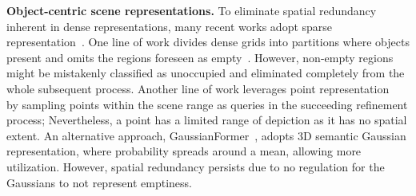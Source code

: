 \textbf{Object-centric scene representations.}
To eliminate spatial redundancy inherent in dense representations, many recent works adopt sparse representation~\cite{tang2024sparseocc,lu2023octreeocc,huang2024gaussian}. 
One line of work divides dense grids into partitions where objects present and omits the regions foreseen as empty~\cite{lu2023octreeocc, tang2024sparseocc}. 
However, non-empty regions might be mistakenly classified as unoccupied and eliminated completely from the whole subsequent process. 
Another line of work leverages point representation ~\cite{shi2024occupancysetpoints, wang2024opus} by sampling points within the scene range as queries in the succeeding refinement process; 
Nevertheless, a point has a limited range of depiction as it has no spatial extent. 
An alternative approach, GaussianFormer~\cite{huang2024gaussian}, adopts 3D semantic Gaussian representation, where probability spreads around a mean, allowing more utilization. However, spatial redundancy persists due to no regulation for the Gaussians to not represent emptiness. 
